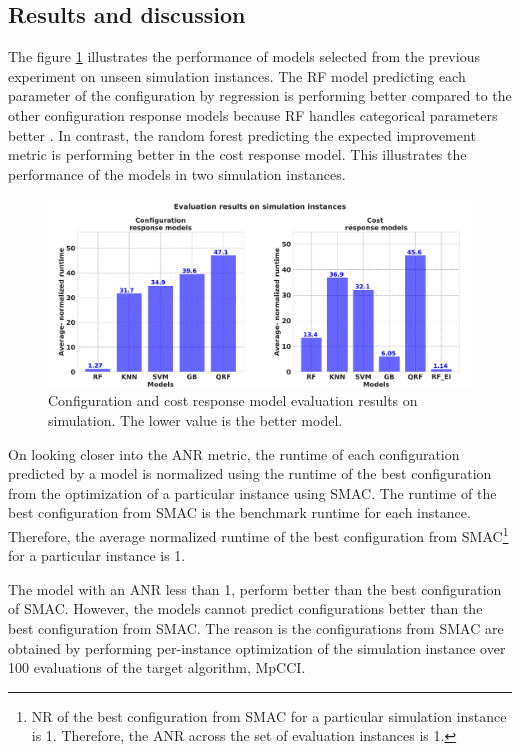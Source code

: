 \subsection{Results and discussion}

The figure \ref{fig:final_eval} illustrates the performance of models selected from the previous experiment on unseen simulation instances. The RF model predicting each parameter of the configuration by regression is performing better compared to the other configuration response models because RF handles categorical parameters better \cite{Hutterphd}. In contrast, the random forest predicting the expected improvement metric is performing better in the cost response model. This illustrates the performance of the models in two simulation instances.

\begin{figure}[!ht]
\centering
\includegraphics[width=\textwidth]{images/final-eval.pdf}
\captionsetup{justification=justified}
\caption[Configuration and cost response models evaluation results]{Configuration and cost response model evaluation results on simulation. The lower value is the better model.}
\label{fig:final_eval}
\end{figure}

On looking closer into the ANR metric, the runtime of each configuration predicted by a model is normalized using the runtime of the best configuration from the optimization of a particular instance using SMAC. The runtime of the best configuration from SMAC is the benchmark runtime for each instance. Therefore, the average normalized runtime of the best configuration from SMAC\footnote{NR of the best configuration from SMAC for a particular simulation instance is 1. Therefore, the ANR across the set of evaluation instances is 1.} for a particular instance is 1.

The model with an ANR less than 1, perform better than the best configuration of SMAC. However, the models cannot predict configurations better than the best configuration from SMAC. The reason is the configurations from SMAC are obtained by performing per-instance optimization of the simulation instance over 100 evaluations of the target algorithm, MpCCI. 

